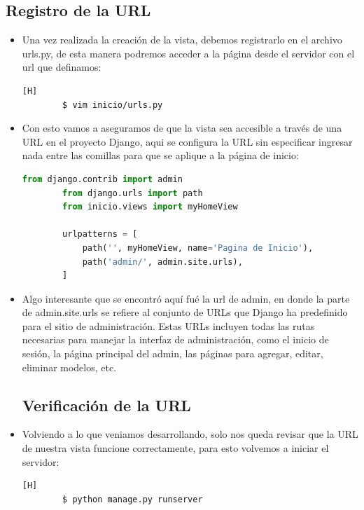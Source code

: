 \documentclass{article}
\begin{document}
        \subsection{Registro de la URL}
        \begin{itemize}
            \item Una vez realizada la creación de la vista, debemos registrarlo en el archivo urls.py, de esta manera podremos acceder a la página desde el servidor con el url que definamos:

        \begin{lstlisting}[language=bash,caption={Ingresando a urls.py}][H]
        $ vim inicio/urls.py
        \end{lstlisting}
            \item Con esto vamos a aseguramos de que la vista sea accesible a través de una URL en el proyecto Django, aqui se configura la URL sin especificar ingresar nada entre las comillas para que se aplique a la página de inicio:
        \begin{lstlisting}[language=Python, caption={Registro de la URL para la vista myHomeView}]
        from django.contrib import admin
        from django.urls import path
        from inicio.views import myHomeView
        
        urlpatterns = [
            path('', myHomeView, name='Pagina de Inicio'),
            path('admin/', admin.site.urls),
        ]
        \end{lstlisting}

            \item Algo interesante que se encontró aquí fué la url de admin, en donde la parte de admin.site.urls se refiere al conjunto de URLs que Django ha predefinido para el sitio de administración. Estas URLs incluyen todas las rutas necesarias para manejar la interfaz de administración, como el inicio de sesión, la página principal del admin, las páginas para agregar, editar, eliminar modelos, etc.
        
        \subsection{Verificación de la URL}
            \item Volviendo a lo que veniamos desarrollando, solo nos queda revisar que la URL de nuestra vista funcione correctamente, para esto volvemos a iniciar el servidor:

        \begin{lstlisting}[language=bash,caption={Inicio del servidor}][H]
        $ python manage.py runserver
        \end{lstlisting}


\end{itemize}
\end{document}
